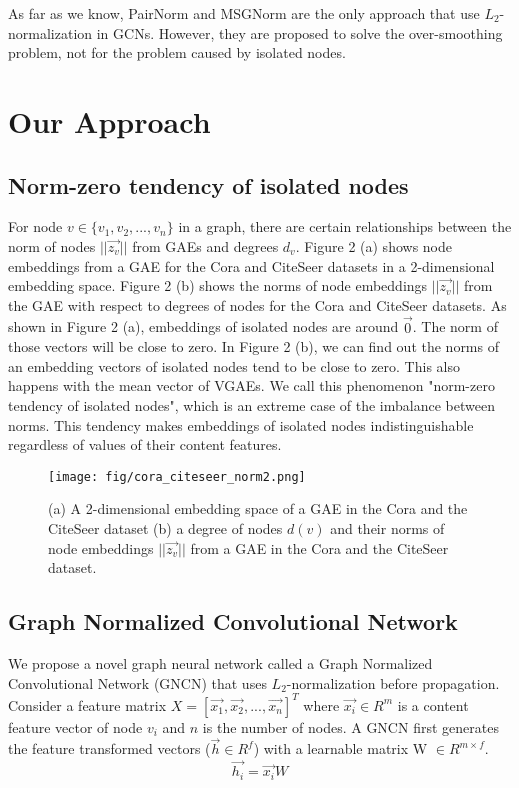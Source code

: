 \documentclass[sigconf]{acmart}
\begin{document}
As far as we know, PairNorm \cite{zhao2019pairnorm} and MSGNorm \cite{li2020deepergcn} are the only approach that use $L_2$-normalization in GCNs.
However, they are proposed to solve the over-smoothing problem, not for the problem caused by isolated nodes.

\section{Our Approach}
\subsection{Norm-zero tendency of isolated nodes}
For node $v \in \{v_1, v_2,..., v_n\}$ in a graph, there are certain relationships between the norm of nodes $||\vec{z_{v}}||$ from GAEs and degrees $d_v$.
Figure 2 (a) shows node embeddings from a GAE for the Cora and CiteSeer datasets in a 2-dimensional embedding space.
Figure 2 (b) shows the norms of node embeddings $||\vec{z_v}||$ from the GAE with respect to degrees of nodes for the Cora and CiteSeer datasets.
As shown in Figure 2 (a), embeddings of isolated nodes are around $\vec{0}$.
The norm of those vectors will be close to zero.
In Figure 2 (b), we can find out the norms of an embedding vectors of isolated nodes tend to be close to zero.
This also happens with the mean vector of VGAEs.
We call this phenomenon "norm-zero tendency of isolated nodes", which is an extreme case of the imbalance between norms.
This tendency makes embeddings of isolated nodes indistinguishable regardless of values of their content features.

\begin{figure}[h]
    \centering
    \texttt{[image: fig/cora\_citeseer\_norm2.png]}
    \caption{(a) A 2-dimensional embedding space of a GAE in the Cora and the CiteSeer dataset (b) a degree of nodes $d(v)$ and their norms of node embeddings $||\vec{z_v}||$ from a GAE in the Cora and the CiteSeer dataset.}
    \label{fig:cluster}
\end{figure}





\subsection{Graph Normalized Convolutional Network}

We propose a novel graph neural network called a Graph Normalized Convolutional Network (GNCN) that uses $L_2$-normalization before propagation.
Consider a feature matrix $X = [\vec{x_1}, \vec{x_2}, ... , \vec{x_n}]^T$ where $\vec{x_i} \in R^m$ is a content feature vector of node $v_i$ and $n$ is the number of nodes.  
A GNCN first generates the feature transformed vectors ($\vec{h} \in R^f$) with a learnable matrix W $\in R^{m \times f}$.
\begin{equation}
    \vec{h_i} = \vec{x_i}W
\end{equation}
\end{document}
